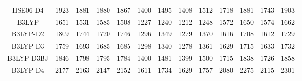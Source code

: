 \begin{table}[ht]
\begin{tabular}{ccccccccccccc}
HSE06-D4 & 1923 & 1881 & 1880 & 1867 & 1400 & 1495 & 1408 & 1512 & 1718 & 1881 & 1743 & 1903 \\ 
B3LYP & 1651 & 1531 & 1585 & 1508 & 1227 & 1240 & 1212 & 1248 & 1572 & 1650 & 1574 & 1662 \\ 
B3LYP-D2 & 1809 & 1744 & 1720 & 1746 & 1296 & 1349 & 1279 & 1370 & 1616 & 1708 & 1612 & 1729 \\ 
B3LYP-D3 & 1759 & 1693 & 1685 & 1685 & 1298 & 1340 & 1278 & 1361 & 1629 & 1715 & 1633 & 1732 \\ 
B3LYP-D3BJ & 1846 & 1798 & 1795 & 1784 & 1400 & 1481 & 1399 & 1500 & 1715 & 1838 & 1726 & 1858 \\ 
B3LYP-D4 & 2177 & 2163 & 2147 & 2152 & 1611 & 1734 & 1629 & 1757 & 2080 & 2275 & 2115 & 2301 \\ 
\hline\hline
\end{tabular}
\end{table}
